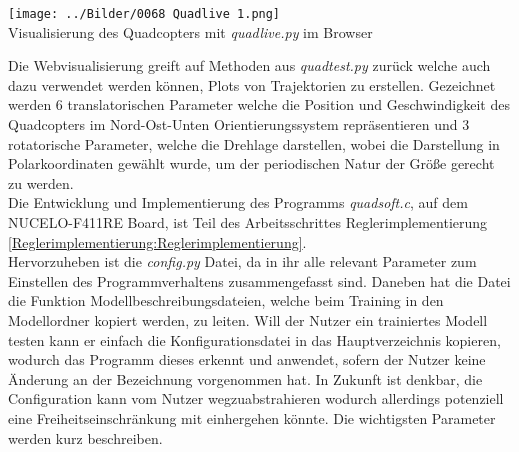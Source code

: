 \begin{center}
	\texttt{[image: ../Bilder/0068 Quadlive 1.png]}{\\Visualisierung des Quadcopters mit \textit{quadlive.py} im Browser}
\end{center}
Die Webvisualisierung greift auf Methoden aus \textit{quadtest.py} zurück welche auch dazu verwendet werden können, Plots von Trajektorien zu erstellen. Gezeichnet werden 6 translatorischen Parameter welche die Position und Geschwindigkeit des Quadcopters im Nord-Ost-Unten Orientierungssystem repräsentieren und 3 rotatorische Parameter, welche die Drehlage darstellen, wobei die Darstellung in Polarkoordinaten gewählt wurde, um der periodischen Natur der Größe gerecht zu werden.\\
Die Entwicklung und Implementierung des Programms \textit{quadsoft.c}, auf dem NUCELO-F411RE Board, ist Teil des Arbeitsschrittes Reglerimplementierung \ref{Reglerimplementierung:Reglerimplementierung}.\\
Hervorzuheben ist die \textit{config.py} Datei, da in ihr alle relevant Parameter zum Einstellen des Programmverhaltens zusammengefasst sind. Daneben hat die Datei die Funktion Modellbeschreibungsdateien, welche beim Training in den Modellordner kopiert werden, zu leiten. Will der Nutzer ein trainiertes Modell testen kann er einfach die Konfigurationsdatei in das Hauptverzeichnis kopieren, wodurch das Programm dieses erkennt und anwendet, sofern der Nutzer keine Änderung an der Bezeichnung vorgenommen hat. In Zukunft ist denkbar, die Configuration kann vom Nutzer wegzuabstrahieren wodurch allerdings potenziell eine Freiheitseinschränkung mit einhergehen könnte. Die wichtigsten Parameter werden kurz beschreiben.
\vspace*{0.5cm}

